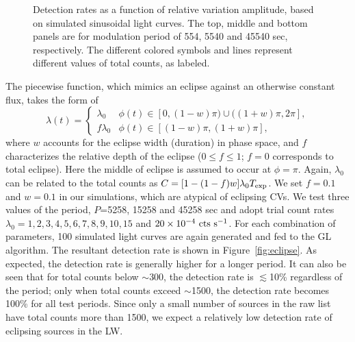 \documentclass[fleqn,usenatbib]{mnras}
\begin{document}
\begin{figure}
\begin{minipage}[b]{0.45\textwidth}
\end{minipage}
\caption{Detection rates as a function of relative variation amplitude, based on simulated sinusoidal light curves. The top, middle and bottom panels are for modulation period of 554, 5540 and 45540 sec, respectively. The different colored symbols and lines represent different values of total counts, as labeled.
\label{fig:detection}}
\end{figure}

The piecewise function, which mimics an eclipse against an otherwise constant flux, takes the form of
\begin{equation}
\lambda(t)=
\begin{cases}
\lambda_0 & \text{$\phi(t) \in[0,(1-w)\pi)\cup ((1+w)\pi,2\pi]$},\\
f\lambda_0 & \text{$\phi(t) \in[(1-w)\pi,(1+w)\pi]$},
\end{cases}	
\end{equation}
where $w$ accounts for the eclipse width (duration) in phase space, and $f$ characterizes the relative depth of the eclipse ($0\leq f \leq 1$; $f = 0$ corresponds to total eclipse). Here the middle of eclipse is assumed to occur at $\phi = \pi$. 
Again, $\lambda_0$ can be related to the total counts as $C=[1-(1-f)w]\lambda_0T_{\rm exp}$.
We set $f=0.1$ and $w=0.1$ in our simulations, which are atypical of eclipsing CVs. 
We test three values of the period, $P$=5258, 15258 and 45258 sec and adopt trial count rates $\lambda_0 = 1, 2, 3, 4, 5, 6, 7, 8, 9, 10, 15$ and $20\times10^{-4}{\rm~cts~s^{-1}}$.
For each combination of parameters, 100 simulated light curves are again generated and fed to the GL algorithm. 
The resultant detection rate is shown in Figure~\ref{fig:eclipse}. 
As expected, the detection rate is generally higher for a longer period.
It can also be seen that for total counts below $\sim$300, the detection rate is $\lesssim$10\% regardless of the period; only when total counts exceed $\sim$1500, the detection rate becomes 100\% for all test periods. 
Since only a small number of sources in the raw list have total counts more than 1500, we expect a relatively low detection rate of eclipsing sources in the LW.  
 
\end{document}

